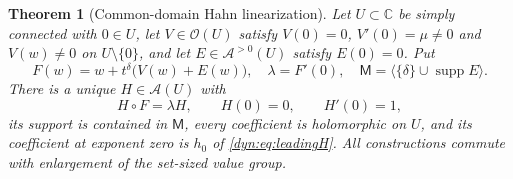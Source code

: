 \documentclass[11pt,letterpaper]{article}
\newtheorem{theorem}{Theorem}[section]
\theoremstyle{definition}
\theoremstyle{remark}
\newcommand{\C}{\mathbb C}
\newcommand{\OO}{\mathcal O}
\newcommand{\AAA}{\mathscr A}
\newcommand{\supp}{\operatorname{supp}}
\numberwithin{equation}{section}
\begin{document}
\begin{theorem}[Common-domain Hahn linearization]\label{dyn:thm:common}
Let $U\subset\C$ be simply connected with $0\in U$, let $V\in\OO(U)$
satisfy $V(0)=0$, $V'(0)=\mu\ne0$ and $V(w)\ne0$ on $U\setminus\{0\}$, and
let $E\in\AAA^{>0}(U)$ satisfy $E(0)=0$. Put
\begin{equation}\label{dyn:eq:generalF}
 F(w)=w+t^{\delta}\bigl(V(w)+E(w)\bigr),\quad \lambda=F'(0),\quad
 \mathsf M=\bigl\langle\{\delta\}\cup\supp E\bigr\rangle .
\end{equation}
There is a unique $H\in\AAA(U)$ with
\begin{equation}\label{dyn:eq:generalH}
 H\circ F=\lambda H,\qquad H(0)=0,\qquad H'(0)=1,
\end{equation}
its support is contained in $\mathsf M$, every coefficient is holomorphic
on $U$, and its coefficient at exponent zero is $h_0$ of
\eqref{dyn:eq:leadingH}. All constructions commute with enlargement of the
set-sized value group.
\end{theorem}
\end{document}
